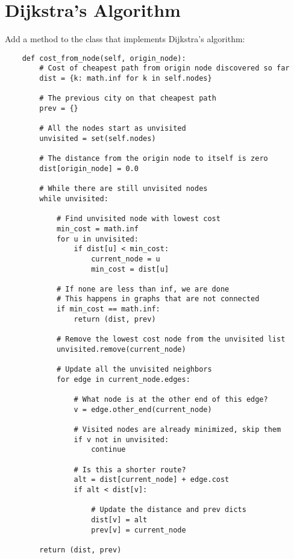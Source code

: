 \chapter{Dijkstra's Algorithm}

Add a method to the  class that implements Dijkstra's algorithm:
\begin{verbatim}
    def cost_from_node(self, origin_node):
        # Cost of cheapest path from origin node discovered so far
        dist = {k: math.inf for k in self.nodes}

        # The previous city on that cheapest path
        prev = {}

        # All the nodes start as unvisited
        unvisited = set(self.nodes)
    
        # The distance from the origin node to itself is zero
        dist[origin_node] = 0.0

        # While there are still unvisited nodes
        while unvisited:

            # Find unvisited node with lowest cost
            min_cost = math.inf
            for u in unvisited:
                if dist[u] < min_cost:
                    current_node = u
                    min_cost = dist[u]

            # If none are less than inf, we are done
            # This happens in graphs that are not connected
            if min_cost == math.inf:
                return (dist, prev)
            
            # Remove the lowest cost node from the unvisited list
            unvisited.remove(current_node)

            # Update all the unvisited neighbors
            for edge in current_node.edges:

                # What node is at the other end of this edge?
                v = edge.other_end(current_node)

                # Visited nodes are already minimized, skip them
                if v not in unvisited:
                    continue

                # Is this a shorter route?
                alt = dist[current_node] + edge.cost
                if alt < dist[v]:

                    # Update the distance and prev dicts
                    dist[v] = alt
                    prev[v] = current_node

        return (dist, prev)
\end{verbatim}

